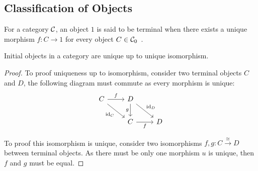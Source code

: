 \subsection{Classification of Objects}

\begin{definition}
  For a category $\mathcal{C}$, an object $1$ is said to be terminal when there exists a
  unique morphism $f: C\to 1$ for every object $C\in
  \mathcal{C}_0$~\parencite[p.~48]{leinster:basic_category_theory}.
\end{definition}

\begin{theorem}\label{thm:terminal_object_iso}
  Initial objects in a category are unique up to unique isomorphism.

  \begin{proof}
    To proof uniqueness up to isomorphism, consider two terminal objects $C$ and
    $D$, the following diagram must commute as every morphism is unique:
    \[\begin{tikzcd}[ampersand replacement=\&]
      C \& D \\
      \& C \& D
      \arrow["{\id_D}", from=1-2, to=2-3]
      \arrow["{\id_C}"', from=1-1, to=2-2]
      \arrow["f", from=1-1, to=1-2]
      \arrow["g"', from=1-2, to=2-2]
      \arrow["f"', from=2-2, to=2-3]
    \end{tikzcd}\]

    To proof this isomorphism is unique, consider two isomorphisms $f, g:
    C\overset{\cong}{\to}D$ between terminal objects. As there must be only one
    morphism $u$ is unique, then $f$ and $g$ must be equal.
  \end{proof}
\end{theorem}

